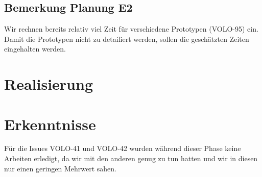    	\subsection{Bemerkung Planung E2}
   	Wir rechnen bereits relativ viel Zeit für verschiedene Prototypen (VOLO-95) ein. Damit die Prototypen nicht zu detailiert werden, sollen die geschätzten Zeiten eingehalten werden.

	\section{Realisierung}
	
	\section{Erkenntnisse}
	Für die Issues VOLO-41 und VOLO-42 wurden während dieser Phase keine Arbeiten erledigt, da wir mit den anderen genug zu tun hatten und wir in diesen nur einen geringen Mehrwert sahen.